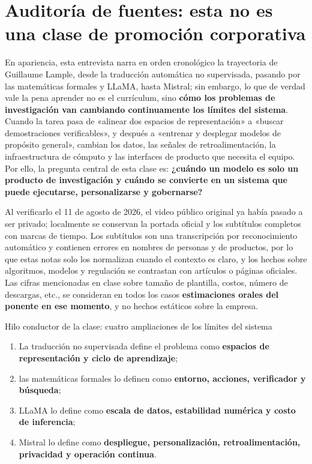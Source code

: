 \section{Auditoría de fuentes: esta no es una clase de promoción corporativa}

En apariencia, esta entrevista narra en orden cronológico la trayectoria de Guillaume Lample, desde la traducción automática no supervisada, pasando por las matemáticas formales y LLaMA, hasta Mistral; sin embargo, lo que de verdad vale la pena aprender no es el currículum, sino \textbf{cómo los problemas de investigación van cambiando continuamente los límites del sistema}. Cuando la tarea pasa de «alinear dos espacios de representación» a «buscar demostraciones verificables», y después a «entrenar y desplegar modelos de propósito general», cambian los datos, las señales de retroalimentación, la infraestructura de cómputo y las interfaces de producto que necesita el equipo. Por ello, la pregunta central de esta clase es: \textbf{¿cuándo un modelo es solo un producto de investigación y cuándo se convierte en un sistema que puede ejecutarse, personalizarse y gobernarse?}

Al verificarlo el 11 de agosto de 2026, el video público original ya había pasado a ser privado; localmente se conservan la portada oficial y los subtítulos completos con marcas de tiempo. Los subtítulos son una transcripción por reconocimiento automático y contienen errores en nombres de personas y de productos, por lo que estas notas solo los normalizan cuando el contexto es claro, y los hechos sobre algoritmos, modelos y regulación se contrastan con artículos o páginas oficiales. Las cifras mencionadas en clase sobre tamaño de plantilla, costos, número de descargas, etc., se consideran en todos los casos \textbf{estimaciones orales del ponente en ese momento}, y no hechos estáticos sobre la empresa.

\begin{importantbox}{Hilo conductor de la clase: cuatro ampliaciones de los límites del sistema}
\begin{enumerate}
  \item La traducción no supervisada define el problema como \textbf{espacios de representación y ciclo de aprendizaje};
  \item las matemáticas formales lo definen como \textbf{entorno, acciones, verificador y búsqueda};
  \item LLaMA lo define como \textbf{escala de datos, estabilidad numérica y costo de inferencia};
  \item Mistral lo define como \textbf{despliegue, personalización, retroalimentación, privacidad y operación continua}.
\end{enumerate}
\end{importantbox}

